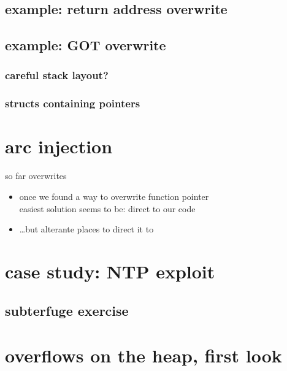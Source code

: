 \subsection{example: return address overwrite}


\subsection{example: GOT overwrite}


\subsubsection{careful stack layout?}


\subsubsection{structs containing pointers}


\section{arc injection}
\begin{frame}{so far overwrites}
    \begin{itemize}
    \item once we found a way to overwrite function pointer\\
          easiest solution seems to be: direct to our code
    \item \ldots but alterante places to direct it to
    \end{itemize}
\end{frame}



\section{case study: NTP exploit}


\subsection{subterfuge exercise}


\section{overflows on the heap, first look}
